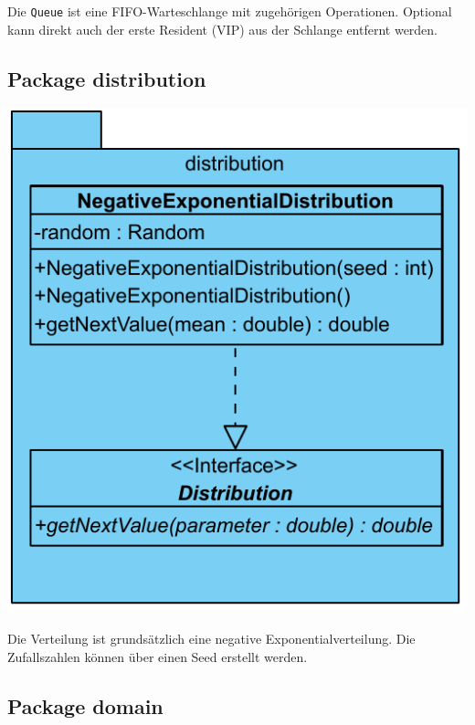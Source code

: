 Die \texttt{Queue} ist eine FIFO-Warteschlange mit zugehörigen Operationen. Optional kann direkt auch der erste Resident (VIP) aus der Schlange entfernt werden. 

\subsection{Package distribution}

\includegraphics[scale=0.3]{abbildungen/uml/distribution.pdf}

Die Verteilung ist grundsätzlich eine negative Exponentialverteilung. Die 
Zufallszahlen können über einen Seed erstellt werden.

\subsection{Package domain}

